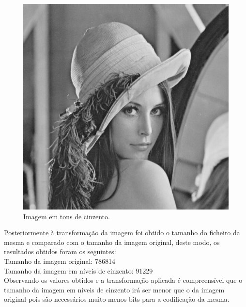 \documentclass[12pt,a4paper]{article}
\begin{document}
\clearpage

\begin{figure}
\includegraphics[scale=0.5]{lenaCinzento}
\centering
\caption{Imagem em tons de cinzento.}
\end{figure}

Posteriormente à transformação da imagem foi obtido o tamanho do ficheiro da mesma e comparado com o tamanho da imagem original, deste modo, os resultados obtidos foram os seguintes:\\
\newline
Tamanho da imagem original: 786814\\
Tamanho da imagem em níveis de cinzento: 91229\\
\newline
Observando os valores obtidos e a transformação aplicada é compreensível que o tamanho da imagem em níveis de cinzento irá ser menor que o da imagem original pois são necessários muito menos bits para a codificação da mesma.
\clearpage
\end{document}
